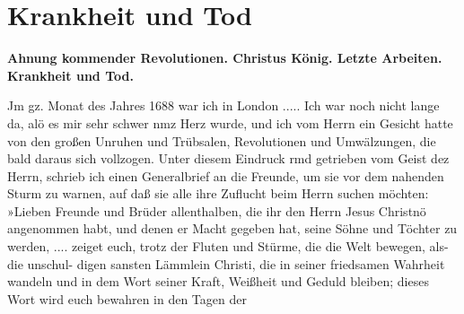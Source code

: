 

\chapter[Krankheit und Tod]{Krankheit und Tod}

\begin{center}
\textbf{Ahnung kommender Revolutionen. Christus König. Letzte
Arbeiten. Krankheit und Tod.}
\end{center}

Jm gz. Monat des Jahres 1688 war ich in London .....
Ich war noch nicht lange da, alö es mir sehr schwer nmz Herz
wurde, und ich vom Herrn ein Gesicht hatte von den großen
Unruhen und Trübsalen, Revolutionen und Umwälzungen, die bald
daraus sich vollzogen. Unter diesem Eindruck rmd getrieben vom
Geist dez Herrn, schrieb ich einen Generalbrief an die Freunde,
um sie vor dem nahenden Sturm zu warnen, auf daß sie alle
ihre Zuflucht beim Herrn suchen möchten:
»Lieben Freunde und Brüder allenthalben, die ihr den Herrn
Jesus Christnö angenommen habt, und denen er Macht gegeben
hat, seine Söhne und Töchter zu werden, .... zeiget euch, trotz
der Fluten und Stürme, die die Welt bewegen, als- die unschul-
digen sansten Lämmlein Christi, die in seiner friedsamen Wahrheit
wandeln und in dem Wort seiner Kraft, Weißheit und Geduld
bleiben; dieses Wort wird euch bewahren in den Tagen der


